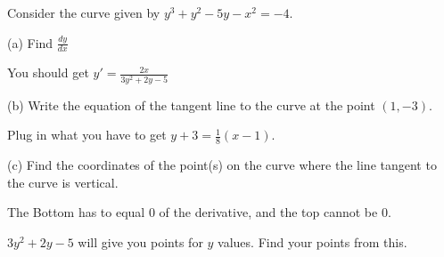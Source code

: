 \documentclass[../bccalc.tex]{subfiles}
\begin{document}
\begin{example}
    Consider the curve given by $y^3+y^2-5y-x^2=-4$.

    (a) Find $\frac{dy}{dx}$

    You should get $y'=\frac{2x}{3y^2+2y-5}$

    (b) Write the equation of the tangent line to the curve at the point $(1,-3)$.

    Plug in what you have to get $y+3=\frac{1}{8}(x-1)$.

    (c) Find the coordinates of the point(s) on the curve where the line tangent to the curve is vertical.

    The Bottom has to equal 0 of the derivative, and the top cannot be 0.

    $3y^2+2y-5$ will give you points for $y$ values. Find your points from this.
\end{example}
\end{document}
